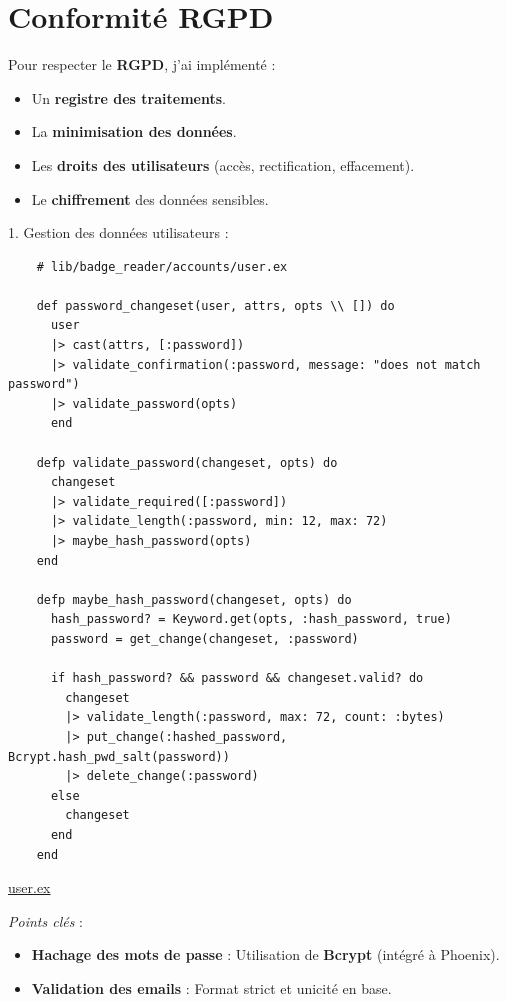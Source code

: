\newpage

\section{Conformité RGPD}

Pour respecter le \textbf{RGPD}, j’ai implémenté :
\begin{itemize}
    \item Un \textbf{registre des traitements}.
    \item La \textbf{minimisation des données}.
    \item Les \textbf{droits des utilisateurs} (accès, rectification, effacement).
    \item Le \textbf{chiffrement} des données sensibles.
    \newline
\end{itemize}

\begin{for_you}{1. Gestion des données utilisateurs :}
    \begin{lstlisting}
    # lib/badge_reader/accounts/user.ex
     
    def password_changeset(user, attrs, opts \\ []) do
      user
      |> cast(attrs, [:password])
      |> validate_confirmation(:password, message: "does not match password")
      |> validate_password(opts)
      end

    defp validate_password(changeset, opts) do
      changeset
      |> validate_required([:password])
      |> validate_length(:password, min: 12, max: 72)
      |> maybe_hash_password(opts)
    end

    defp maybe_hash_password(changeset, opts) do
      hash_password? = Keyword.get(opts, :hash_password, true)
      password = get_change(changeset, :password)

      if hash_password? && password && changeset.valid? do
        changeset
        |> validate_length(:password, max: 72, count: :bytes)
        |> put_change(:hashed_password, Bcrypt.hash_pwd_salt(password))
        |> delete_change(:password)
      else
        changeset
      end
    end
    \end{lstlisting}

    \href{https://github.com/Theoden-bernard/badge_reader_project/blob/develop/badge_reader/lib/badge_reader/accounts/user.ex}{user.ex \newline}

    \textit{Points clés} :
    \begin{itemize}
        \item \textbf{Hachage des mots de passe} : Utilisation de \textbf{Bcrypt} (intégré à Phoenix).
        \item \textbf{Validation des emails} : Format strict et unicité en base.
    \end{itemize}
\end{for_you}

